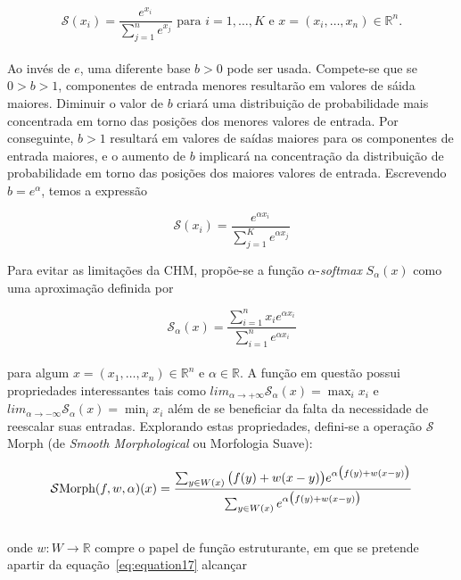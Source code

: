 \begin{equation}
    \mathcal{S}(x_{i}) = \frac{e^{x_{i}}}{\sum_{j=1}^{n} e^{x_{j}}} \text{ para } i = 1, \dots, K
    \text{ e } x = (x_{i}, \dots, x_{n}) \in \mathbb{R}^{n}.
    \label{eq:equation14}
\end{equation}
\\
Ao invés de $e$, uma diferente base $b > 0$ pode ser usada.
Compete-se que se $0 > b > 1$, componentes de entrada menores resultarão em valores de sáida maiores.
Diminuir o valor de $b$ criará uma distribuição de probabilidade mais concentrada em torno das posições dos menores valores de entrada.
Por conseguinte, $b > 1$ resultará em valores de saídas maiores para os componentes de entrada maiores, e o aumento de $b$ implicará na concentração da distribuição de probabilidade em torno das posições dos maiores valores de entrada.
Escrevendo $b = e^{\alpha}$, temos a expressão

\begin{equation}
    \mathcal{S}(x_{i}) = \frac{e^{\alpha x_{i}}}{\sum_{j=1}^{K} e^{\alpha x_{j}}}
    \label{eq:equation15}
\end{equation}

Para evitar as limitações da CHM, propõe-se a função $\alpha$-\emph{softmax} $S_{\alpha}(x)$ como uma aproximação definida por

\begin{equation}
    \mathcal{S}_{\alpha}(x) = \frac{\sum_{i=1}^{n} x_{i}e^{\alpha x_{i}}}
    {\sum_{i=1}^{n} e^{\alpha x_{i}}}
    \label{eq:equation16}
\end{equation}
\\
para algum $x = (x_{1}, \dots, x_{n}) \in \mathbb{R}^{n}$ e $\alpha \in \mathbb{R}$.
A função em questão possui propriedades interessantes tais como $lim_{\alpha \to +\infty} \mathcal{S}_{\alpha}(x) = \max_{i}x_{i}$ e $lim_{\alpha \to -\infty} \mathcal{S}_{\alpha}(x) = \min_{i}x_{i}$ além de se beneficiar da falta da necessidade de reescalar suas entradas.
Explorando estas propriedades, defini-se a operação $\mathcal{S}$Morph (de \emph{Smooth Morphological} ou Morfologia Suave):

\begin{equation}
    \mathcal{S}\text{Morph}(f, w, \alpha)(x) =
    \frac{\sum_{y \in W(x)} \big{(}f(y) + w(x - y)\big{)}e^{\alpha \big{(}f(y) + w(x - y)\big{)}}}
    {\sum_{y \in W(x)} e^{\alpha \big{(}f(y) + w(x - y)\big{)}}}
    \label{eq:equation17}
\end{equation}
\\
onde $w: W \to \mathbb{R}$ compre o papel de função estruturante, em que se pretende apartir da equação~\ref{eq:equation17} alcançar

